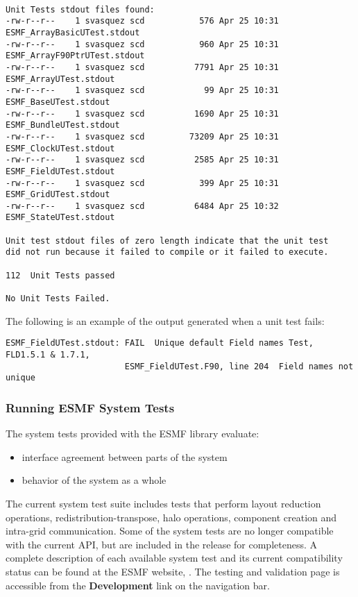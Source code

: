 \begin{verbatim}

Unit Tests stdout files found: 
-rw-r--r--    1 svasquez scd           576 Apr 25 10:31 ESMF_ArrayBasicUTest.stdout
-rw-r--r--    1 svasquez scd           960 Apr 25 10:31 ESMF_ArrayF90PtrUTest.stdout
-rw-r--r--    1 svasquez scd          7791 Apr 25 10:31 ESMF_ArrayUTest.stdout
-rw-r--r--    1 svasquez scd            99 Apr 25 10:31 ESMF_BaseUTest.stdout
-rw-r--r--    1 svasquez scd          1690 Apr 25 10:31 ESMF_BundleUTest.stdout
-rw-r--r--    1 svasquez scd         73209 Apr 25 10:31 ESMF_ClockUTest.stdout
-rw-r--r--    1 svasquez scd          2585 Apr 25 10:31 ESMF_FieldUTest.stdout
-rw-r--r--    1 svasquez scd           399 Apr 25 10:31 ESMF_GridUTest.stdout
-rw-r--r--    1 svasquez scd          6484 Apr 25 10:32 ESMF_StateUTest.stdout

Unit test stdout files of zero length indicate that the unit test
did not run because it failed to compile or it failed to execute. 

112  Unit Tests passed 

No Unit Tests Failed.

\end{verbatim}

The following is an example of the output generated when a unit test fails:
\begin{verbatim}
ESMF_FieldUTest.stdout: FAIL  Unique default Field names Test, FLD1.5.1 & 1.7.1,
                        ESMF_FieldUTest.F90, line 204  Field names not unique
\end{verbatim}

\subsubsection{Running ESMF System Tests}
\label{SystemTestDescription}

The system tests provided with the ESMF library evaluate:
\begin{itemize}
\item interface agreement between parts of the system
\item behavior of the system as a whole
\end{itemize}

The current system test suite includes tests that perform layout
reduction operations, redistribution-transpose, halo operations,
component creation and intra-grid communication.  Some of the system
tests are no longer compatible with the current API, but are included
in the release for completeness.  A complete description of each
available system test and its current compatibility status can be
found at the ESMF website,
.  The testing
and validation page is accessible from the {\bf Development} link on the navigation bar.

